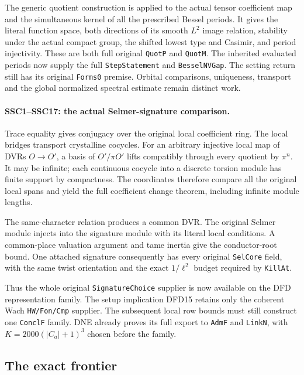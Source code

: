 The generic quotient construction is applied to the actual tensor
coefficient map and the simultaneous kernel of all the prescribed
Bessel periods. It gives the literal function space, both directions
of its smooth $L^2$ image relation, stability under the actual compact
group, the shifted lowest type and Casimir, and period injectivity.
These are both full original \texttt{Quot\allowbreak P} and \texttt{Quot\allowbreak M}.
The inherited evaluated periods now supply the full
\texttt{Step\allowbreak Statement} and \texttt{Bessel\allowbreak NVGap}.
The setting return still has its original \texttt{Forms0}
premise. Orbital comparisons, uniqueness, transport and the global
normalized spectral estimate remain distinct work.

\paragraph{SSC1--SSC17: the actual Selmer-signature comparison.}
Trace equality gives conjugacy over the original local coefficient
ring. The local bridges transport crystalline cocycles. For an
arbitrary injective local map of DVRs $O\to O'$, a basis of
$O'/\pi O'$ lifts compatibly through every quotient by $\pi^n$.
It may be infinite; each continuous cocycle into a discrete torsion
module has finite support by compactness. The coordinates therefore
compare all the original local spans and yield the full coefficient
change theorem, including infinite module lengths.

The same-character relation produces a common DVR. The original
Selmer module injects into the signature module with its literal
local conditions. A common-place valuation argument and tame inertia
give the conductor-root bound. One attached signature consequently
has every original \texttt{Sel\allowbreak Core} field, with the same twist
orientation and the exact $1/\ell^2$ budget required by
\texttt{Kill\allowbreak At}.

Thus the whole original \texttt{Signature\allowbreak Choice} supplier is now
available on the DFD representation family. The setup implication
DFD15 retains only the coherent Wach \texttt{HW/\allowbreak Fon/\allowbreak Cmp} supplier.
The subsequent local row bounds must still construct one
\texttt{Concl\allowbreak F} family. DNE already proves its full export to
\texttt{Adm\allowbreak F} and \texttt{Link\allowbreak N}, with
$K=2000(|C_a|+1)^3$ chosen before the family.

\subsection{The exact frontier}

